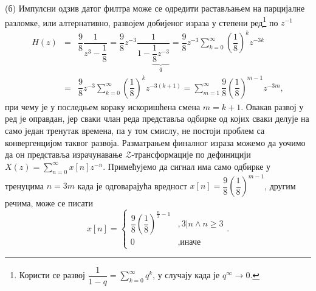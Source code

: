 (б) Импулсни одзив датог филтра може се одредити растављањем на парцијалне разломке, или алтернативно, 
развојем добијеног израза у степени ред\footnote{ Користи се развој
$\dfrac{1}{1 - q} = \sum_{k = 0}^\infty q^k$, у случају када је $q^\infty \to 0$. } по $z^{-1}$ 
\begin{eqnarray}
    H(z) &=& \dfrac{9}{8} \dfrac{1}{z^3 - \dfrac{1}{8}} =
           \dfrac{9}{8} z^{-3} \dfrac{1}{1 - \underbrace{\dfrac{1}{8}z^{-3}}_q }
         = \dfrac{9}{8} z^{-3} \sum_{k = 0}^{\infty} \left(\dfrac{1}{8}\right)^k z^{-3k} \\
         &=& \dfrac{9}{8} z^{-3} \sum_{k = 0}^{\infty} \left(\dfrac{1}{8}\right)^k z^{-3(k+1)} 
        =  \sum_{m = 1}^{\infty} \dfrac{9}{8}\left(\dfrac{1}{8}\right)^{m-1} z^{-3m},
\end{eqnarray}
при чему је у последњем кораку искоришћена смена $m = k + 1$. 
Овакав развој у ред је оправдан, јер сваки члан реда представља одбирке од којих сваки делује на само један тренутак времена, 
па у том смислу, не постоји проблем са конвергенцијом таквог развоја. Разматрањем финалног израза можемо да уочимо да 
он представља израчунавање $\mathcal{Z}$-трансформације по дефиницији 
$X(z) = \sum_{n = 0}^{\infty} x[n] z^{-n}$. Примећујемо да сигнал има само одбирке у тренуцима $n = 3m$ када је 
одговарајућа вредност $x[n] = \dfrac{9}{8}\left(\dfrac{1}{8}\right)^{m-1}$, другим речима, може се писати 
\begin{equation}
    x[n] = \begin{cases}
        \dfrac{9}{8}\left(\dfrac{1}{8}\right)^{\frac{n}{3}-1} &, 3|n \land n \geq 3 \\
        0 &, \text{иначе}
    \end{cases}.
\end{equation}
